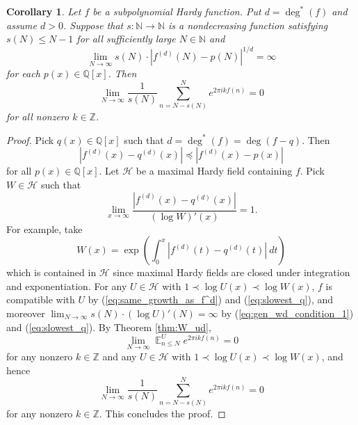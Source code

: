 \documentclass[12pt]{article}
\theoremstyle{plain} %
\newtheorem{corollary}[theorem]{Corollary}
\theoremstyle{definition} %
\theoremstyle{plain}
\theoremstyle{plain}
\numberwithin{equation}{section}
\newcommand{\N}{\mathbb{N}}
\newcommand{\Z}{\mathbb{Z}}
\newcommand{\Q}{\mathbb{Q}}
\renewcommand{\leq}{\leqslant}
\newcommand{\1}{\mathbbm{1}}
\newcommand{\E}{\operatorname{\mathbb{E}}}
\newcommand{\oo}{\infty}
\begin{document}
\begin{corollary}\label{cor:gen_wd_condition}
     Let $f$ be a subpolynomial Hardy function. Put $d=\deg^*(f)$ and assume $d>0$.
Suppose that $s:\N\rightarrow\N$ is a nondecreasing  function satisfying $s(N)\leq N-1$ for all sufficiently large $N\in \N$ and
\begin{equation}\label{eq:gen_wd_condition_1}
         \lim_{N\to\oo}s(N)\cdot |f^{(d)}(N)-p(N)|^{1/d}=\oo
\end{equation}
         for each $p(x)\in \Q[x]$. Then
         \begin{equation}\label{eq:gen_wd_condition_2}
         \lim_{N\to\oo}\frac{1}{s(N)}\sum_{n=N-s(N)}^Ne^{2\pi i kf(n)} = 0
         \end{equation}
        for all nonzero $k\in \mathbb{Z}$.

\end{corollary}
\begin{proof}
Pick $q(x)\in \Q[x]$ such that $d=\deg^*(f)=\deg(f-q)$. Then 
\begin{equation} \label{eq:slowest_q}
|f^{(d)}(x)-q^{(d)}(x)|\preceq |f^{(d)}(x)-p(x)|
\end{equation}
for all $p(x)\in \Q[x]$. Let $\mathcal{H}$ be a maximal Hardy field containing $f$. Pick $W\in \mathcal{H}$ such that 
\begin{equation}\label{eq:same_growth_as_f^d}
    \lim_{x\to\oo}\frac{|f^{(d)}(x)-q^{(d)}(x)|}{(\log W)'(x)}=1.
\end{equation}
For example, take 
\begin{equation}\label{eq:example_hardy}
W(x) = \exp\left(\int_0^x |f^{(d)}(t)-q^{(d)}(t)|~dt\right)
\end{equation}
which is contained in $\mathcal{H}$ since maximal Hardy fields are closed under integration and exponentiation. 
For any $U\in \mathcal{H}$ with $1\prec \log U(x)\prec \log W(x)$, $f$ is compatible with $U$ by (\ref{eq:same_growth_as_f^d}) and (\ref{eq:slowest_q}), and moreover $\lim_{N\to\oo}s(N)\cdot (\log U)'(N) = \oo$ by (\ref{eq:gen_wd_condition_1}) and (\ref{eq:slowest_q}). By Theorem \ref{thm:W_ud}, 
\[
\lim_{N\to\oo}\E_{n\leq N}^Ue^{2\pi i k f(n)}=0
\]
for any nonzero $k\in \Z$ and any $U\in \mathcal{H}$ with $1\prec \log U(x)\prec \log W(x)$, and hence
\[
\lim_{N\to\oo}\frac{1}{s(N)}\sum_{n=N-s(N)}^N e^{2\pi i k f(n)}=0
\]
for any nonzero $k\in \Z$. This concludes the proof.
\end{proof}
\end{document}
